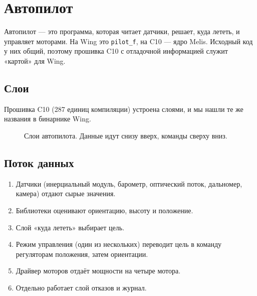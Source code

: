 \chapter{Автопилот}

Автопилот --- это программа, которая читает датчики, решает, куда лететь, и управляет моторами. На Wing это \texttt{pilot\_f}, на C10 --- ядро Melis. Исходный код у них общий, поэтому прошивка C10 с отладочной информацией служит «картой» для Wing.

\section{Слои}

Прошивка C10 (287 единиц компиляции) устроена слоями, и мы нашли те же названия в бинарнике Wing.

\begin{figure}[tbp]
\centering
{}
\caption{Слои автопилота. Данные идут снизу вверх, команды сверху вниз.}\label{fig:layers}
\end{figure}

\section{Поток данных}

\begin{enumerate}
  \item Датчики (инерциальный модуль, барометр, оптический поток, дальномер, камера) отдают сырые значения.
  \item Библиотеки оценивают ориентацию, высоту и положение.
  \item Слой «куда лететь» выбирает цель.
  \item Режим управления (один из нескольких) переводит цель в команду регуляторам положения, затем ориентации.
  \item Драйвер моторов отдаёт мощности на четыре мотора.
  \item Отдельно работает слой отказов и журнал.
\end{enumerate}

